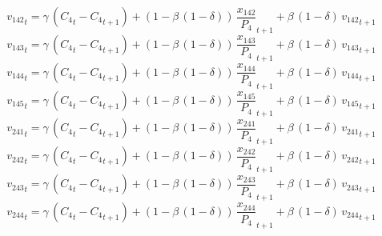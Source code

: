 \begin{dmath}
{{v_{142}}}_{t}={{\gamma}}\, \left({{C_{4}}}_{t}-{{C_{4}}}_{t+1}\right)+\left(1-{{\beta}}\, \left(1-{{\delta}}\right)\right)\, {{\frac{x_{142}}{P_{4}}}}_{t+1}+{{\beta}}\, \left(1-{{\delta}}\right)\, {{v_{142}}}_{t+1}
\end{dmath}
\begin{dmath}
{{v_{143}}}_{t}={{\gamma}}\, \left({{C_{4}}}_{t}-{{C_{4}}}_{t+1}\right)+\left(1-{{\beta}}\, \left(1-{{\delta}}\right)\right)\, {{\frac{x_{143}}{P_{4}}}}_{t+1}+{{\beta}}\, \left(1-{{\delta}}\right)\, {{v_{143}}}_{t+1}
\end{dmath}
\begin{dmath}
{{v_{144}}}_{t}={{\gamma}}\, \left({{C_{4}}}_{t}-{{C_{4}}}_{t+1}\right)+\left(1-{{\beta}}\, \left(1-{{\delta}}\right)\right)\, {{\frac{x_{144}}{P_{4}}}}_{t+1}+{{\beta}}\, \left(1-{{\delta}}\right)\, {{v_{144}}}_{t+1}
\end{dmath}
\begin{dmath}
{{v_{145}}}_{t}={{\gamma}}\, \left({{C_{4}}}_{t}-{{C_{4}}}_{t+1}\right)+\left(1-{{\beta}}\, \left(1-{{\delta}}\right)\right)\, {{\frac{x_{145}}{P_{4}}}}_{t+1}+{{\beta}}\, \left(1-{{\delta}}\right)\, {{v_{145}}}_{t+1}
\end{dmath}
\begin{dmath}
{{v_{241}}}_{t}={{\gamma}}\, \left({{C_{4}}}_{t}-{{C_{4}}}_{t+1}\right)+\left(1-{{\beta}}\, \left(1-{{\delta}}\right)\right)\, {{\frac{x_{241}}{P_{4}}}}_{t+1}+{{\beta}}\, \left(1-{{\delta}}\right)\, {{v_{241}}}_{t+1}
\end{dmath}
\begin{dmath}
{{v_{242}}}_{t}={{\gamma}}\, \left({{C_{4}}}_{t}-{{C_{4}}}_{t+1}\right)+\left(1-{{\beta}}\, \left(1-{{\delta}}\right)\right)\, {{\frac{x_{242}}{P_{4}}}}_{t+1}+{{\beta}}\, \left(1-{{\delta}}\right)\, {{v_{242}}}_{t+1}
\end{dmath}
\begin{dmath}
{{v_{243}}}_{t}={{\gamma}}\, \left({{C_{4}}}_{t}-{{C_{4}}}_{t+1}\right)+\left(1-{{\beta}}\, \left(1-{{\delta}}\right)\right)\, {{\frac{x_{243}}{P_{4}}}}_{t+1}+{{\beta}}\, \left(1-{{\delta}}\right)\, {{v_{243}}}_{t+1}
\end{dmath}
\begin{dmath}
{{v_{244}}}_{t}={{\gamma}}\, \left({{C_{4}}}_{t}-{{C_{4}}}_{t+1}\right)+\left(1-{{\beta}}\, \left(1-{{\delta}}\right)\right)\, {{\frac{x_{244}}{P_{4}}}}_{t+1}+{{\beta}}\, \left(1-{{\delta}}\right)\, {{v_{244}}}_{t+1}
\end{dmath}
